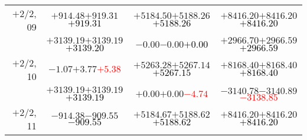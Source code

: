 \documentclass[compress]{beamer}
\begin{document}
\begin{frame}
{\begin{tabular}{r | c | c | c}
$+$2/2, 09 & $+914.48$\hspace{0.1 cm}$+919.31$\hspace{0.1 cm}\textcolor{black}{$+919.31$} & $+5184.50$\hspace{0.1 cm}$+5188.26$\hspace{0.1 cm}\textcolor{black}{$+5188.26$} & $+8416.20$\hspace{0.1 cm}$+8416.20$\hspace{0.1 cm}\textcolor{black}{$+8416.20$} \\
           & $+3139.19$\hspace{0.1 cm}$+3139.19$\hspace{0.1 cm}\textcolor{black}{$+3139.20$} & $-0.00$\hspace{0.1 cm}$-0.00$\hspace{0.1 cm}\textcolor{black}{$+0.00$} & $+2966.70$\hspace{0.1 cm}$+2966.59$\hspace{0.1 cm}\textcolor{black}{$+2966.59$} \\
$+$2/2, 10 & $-1.07$\hspace{0.1 cm}$+3.77$\hspace{0.1 cm}\textcolor{red}{$+5.38$} & $+5263.28$\hspace{0.1 cm}$+5267.14$\hspace{0.1 cm}\textcolor{black}{$+5267.15$} & $+8168.40$\hspace{0.1 cm}$+8168.40$\hspace{0.1 cm}\textcolor{black}{$+8168.40$} \\
           & $+3139.19$\hspace{0.1 cm}$+3139.19$\hspace{0.1 cm}\textcolor{black}{$+3139.19$} & $+0.00$\hspace{0.1 cm}$+0.00$\hspace{0.1 cm}\textcolor{red}{$-4.74$} & $-3140.78$\hspace{0.1 cm}$-3140.89$\hspace{0.1 cm}\textcolor{red}{$-3138.85$} \\
$+$2/2, 11 & $-914.38$\hspace{0.1 cm}$-909.55$\hspace{0.1 cm}\textcolor{black}{$-909.55$} & $+5184.67$\hspace{0.1 cm}$+5188.62$\hspace{0.1 cm}\textcolor{black}{$+5188.62$} & $+8416.20$\hspace{0.1 cm}$+8416.20$\hspace{0.1 cm}\textcolor{black}{$+8416.20$} \\

\end{tabular}}
\end{frame}
\end{document}
